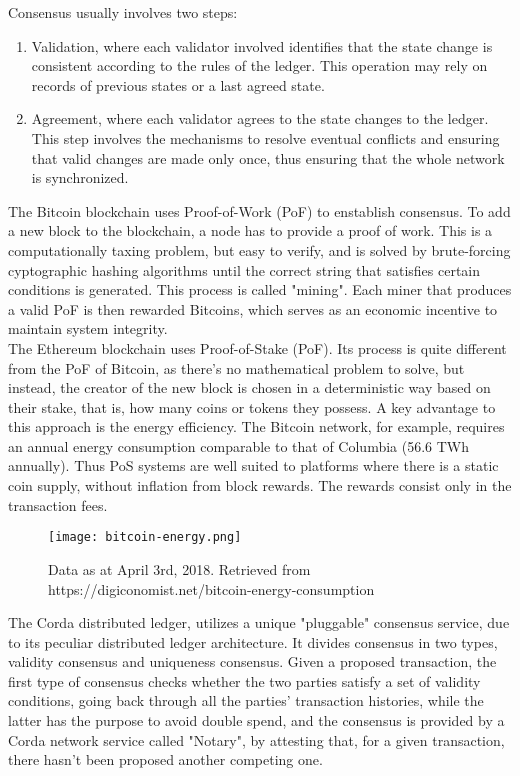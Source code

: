 Consensus usually involves two steps:
\begin{enumerate}
    \item Validation, where each validator involved identifies that the state change is consistent according to the rules of the ledger. This operation may rely on records of previous states or a last agreed state.
    \item Agreement, where each validator agrees to the state changes to the ledger. This step involves the mechanisms to resolve eventual conflicts and ensuring that valid changes are made only once, thus ensuring that the whole network is synchronized.
\end{enumerate}


The Bitcoin blockchain uses Proof-of-Work (PoF) to enstablish consensus. To add a new block to the blockchain, a node has to provide a proof of work. This is a computationally taxing problem, but easy to verify, and is solved by brute-forcing cyptographic hashing algorithms until the correct string that satisfies certain conditions is generated. This process is called "mining". Each miner that produces a valid PoF is then rewarded Bitcoins, which serves as an economic incentive to maintain system integrity.\\

The Ethereum blockchain uses Proof-of-Stake (PoF). Its process is quite different from the PoF of Bitcoin, as there's no mathematical problem to solve, but instead, the creator of the new block is chosen in a deterministic way based on their stake, that is, how many coins or tokens they possess. 
A key advantage to this approach is the energy efficiency. The Bitcoin network, for example, requires an annual energy consumption comparable to that of Columbia (56.6 TWh annually). 
Thus PoS systems are well suited to platforms where there is a static coin supply, without inflation from block rewards. The rewards consist only in the transaction fees. \\

\begin{figure}[h]
    \centering
    \texttt{[image: bitcoin-energy.png]}
    \caption{
        Data as at April 3rd, 2018. Retrieved from https://digiconomist.net/bitcoin-energy-consumption}
\end{figure}

The Corda distributed ledger, utilizes a unique "pluggable" consensus service, due to its peculiar distributed ledger architecture. It divides consensus in two types, validity consensus and uniqueness consensus. Given a proposed transaction, the first type of consensus checks whether the two parties satisfy a set of validity conditions, going back through all the parties' transaction histories, while the latter has the purpose to avoid double spend, and the consensus is provided by a Corda network service called "Notary", by attesting that, for a given transaction, there hasn't been proposed another competing one.\\


